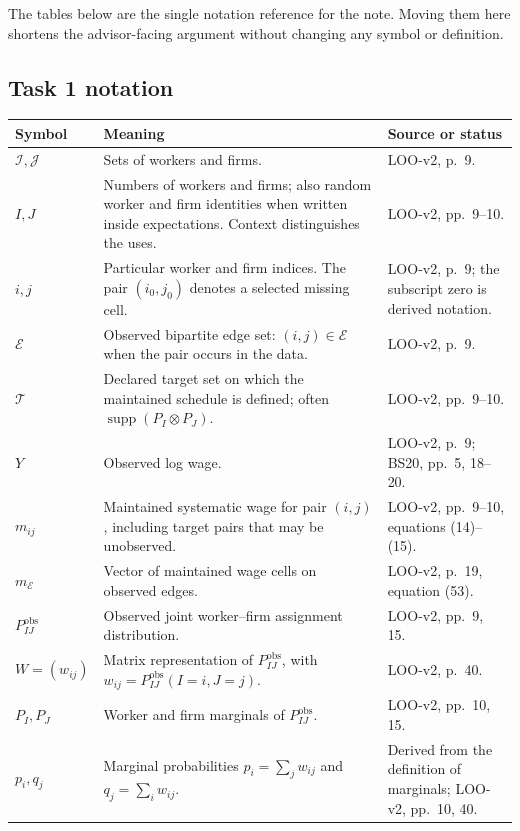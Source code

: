 \documentclass[11pt]{article}
\begin{document}
The tables below are the single notation reference for the note.  Moving them
here shortens the advisor-facing argument without changing any symbol or
definition.

\subsection{Task 1 notation}

\begin{longtable}{p{}p{}p{}}
\textbf{Symbol} & \textbf{Meaning} & \textbf{Source or status} \\
\hline
\(\mathcal I,\mathcal J\) & Sets of workers and firms. & LOO-v2, p.\ 9. \\
\(I,J\) & Numbers of workers and firms; also random worker and firm identities
when written inside expectations.  Context distinguishes the uses. &
LOO-v2, pp.\ 9--10. \\
\(i,j\) & Particular worker and firm indices.  The pair
\((i_0,j_0)\) denotes a selected missing cell. & LOO-v2, p.\ 9; the subscript
zero is derived notation. \\
\(\mathcal E\) & Observed bipartite edge set:
\((i,j)\in\mathcal E\) when the pair occurs in the data. & LOO-v2, p.\ 9. \\
\(\mathcal T\) & Declared target set on which the maintained schedule is
defined; often \(\operatorname{supp}(P_I\otimes P_J)\). & LOO-v2, pp.\ 9--10. \\
\(Y\) & Observed log wage. & LOO-v2, p.\ 9; BS20, pp.\ 5, 18--20. \\
\(m_{ij}\) & Maintained systematic wage for pair \((i,j)\), including target
pairs that may be unobserved. & LOO-v2, pp.\ 9--10, equations (14)--(15). \\
\(m_{\mathcal E}\) & Vector of maintained wage cells on observed edges. &
LOO-v2, p.\ 19, equation (53). \\
\(P^{\mathrm{obs}}_{IJ}\) & Observed joint worker--firm assignment
distribution. & LOO-v2, pp.\ 9, 15. \\
\(W=(w_{ij})\) & Matrix representation of \(P^{\mathrm{obs}}_{IJ}\), with
\(w_{ij}=P^{\mathrm{obs}}_{IJ}(I=i,J=j)\). & LOO-v2, p.\ 40. \\
\(P_I,P_J\) & Worker and firm marginals of \(P^{\mathrm{obs}}_{IJ}\). &
LOO-v2, pp.\ 10, 15. \\
\(p_i,q_j\) & Marginal probabilities
\(p_i=\sum_jw_{ij}\) and \(q_j=\sum_iw_{ij}\). & Derived from the definition
of marginals; LOO-v2, pp.\ 10, 40. \\

\end{longtable}
\end{document}

